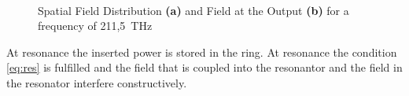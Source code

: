 \begin{figure}%
\centering
	\\%
\caption{Spatial Field Distribution \textbf{(a)} and Field at the Output \textbf{(b)} for a frequency of 211,5~THz}%
\label{fig:3TE}%
\end{figure}





% 
At resonance the inserted power is stored in the ring. At resonance the condition \eqref{eq:res} is fulfilled and the field that is coupled into the resonantor and the field in the resonator interfere constructively. 

